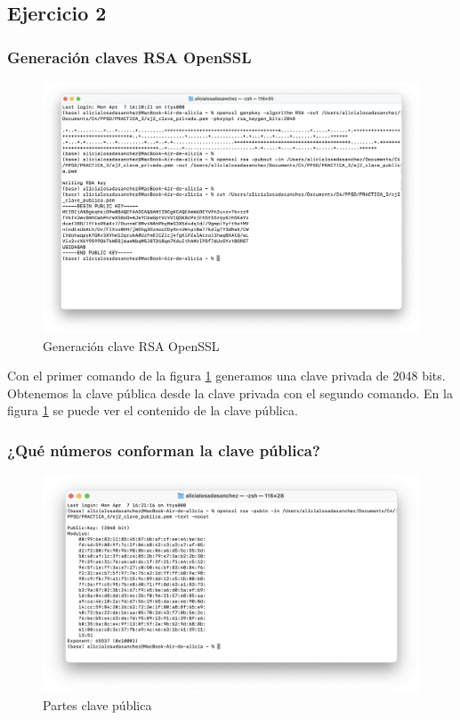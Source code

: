 \subsection{Ejercicio 2}
\graphicspath{ {img/02} }

\subsubsection{Generación claves RSA OpenSSL}

\begin{figure}[H]   
    \centering
    \includegraphics[width=\textwidth]{ej2_a.png}
    \caption{Generación clave RSA OpenSSL}
    \label{fig:generacion_rsa_openssl}
\end{figure}

Con el primer comando de la figura \ref{fig:generacion_rsa_openssl} generamos una clave privada de 2048 bits. Obtenemos la clave pública desde la clave privada con el segundo comando. En la figura \ref{fig:generacion_rsa_openssl} se puede ver el contenido de la clave pública. 


\subsubsection{¿Qué números conforman la clave pública?}

\begin{figure}[H]   
    \centering
    \includegraphics[width=\textwidth]{ej2_b.png}
    \caption{Partes clave pública}
    \label{fig:partes_clave_publica_rsa_openssl}
\end{figure}


